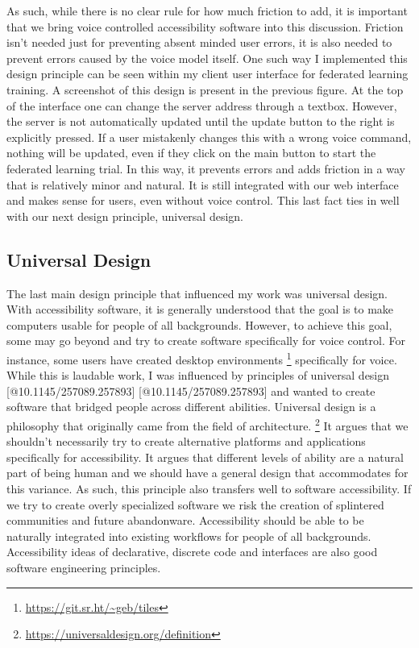 \documentclass[manuscript,screen,review]{acmart}
\begin{document}
{As such, while there is no clear rule for how much friction to add, it is important that we bring voice controlled accessibility software into this discussion. Friction isn't needed just for preventing absent minded user errors, it is also needed to prevent errors caused by the voice model itself. One such way I implemented this design principle can be seen within my client user interface for federated learning training. A screenshot of this design is present in the previous figure. At the top of the interface one can change the server address through a textbox. However, the server is not automatically updated until the update button to the right is explicitly pressed. If a user mistakenly changes this with a wrong voice command, nothing will be updated, even if they click on the main button to start the federated learning trial. In this way, it prevents errors and adds friction in a way that is relatively minor and natural. It is still integrated with our web interface and makes sense for users, even without voice control. This last fact ties in well with our next design principle, universal design.

\subsection{Universal Design}

The last main design principle that influenced my work was universal design. With accessibility software, it is generally understood that the goal is to make computers usable for people of all backgrounds. However, to achieve this goal, some may go beyond and try to create software specifically for voice control. For instance, some users have created desktop environments \footnote{\url{https://git.sr.ht/~geb/tiles}} specifically for voice. While this is laudable work, I was influenced by principles of universal design [@10.1145/257089.257893] [@10.1145/257089.257893] and wanted to create software that bridged people across different abilities. Universal design is a philosophy that originally came from the field of architecture. \footnote{\url{https://universaldesign.org/definition}} It argues that we shouldn't necessarily try to create alternative platforms and applications specifically for accessibility. It argues that different levels of ability are a natural part of being human and we should have a general design that accommodates for this variance. As such, this principle also transfers well to software accessibility. If we try to create overly specialized software we risk the creation of splintered communities and future abandonware. Accessibility should be able to be naturally integrated into existing workflows for people of all backgrounds. Accessibility ideas of declarative, discrete code and interfaces are also good software engineering principles.

}
\end{document}
